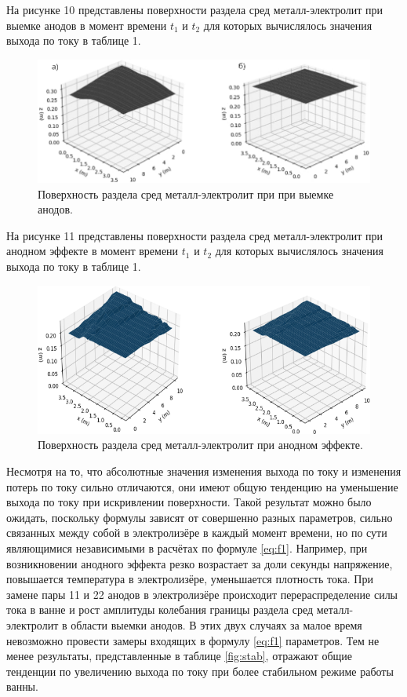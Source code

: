 \documentclass[]{pmi}
\begin{document}
На рисунке 10 представлены поверхности раздела сред металл-электролит при выемке анодов в момент времени $t_1$ и $t_2$ для которых вычислялось значения выхода по току в таблице 1.

\begin{figure}[H]
    \centering
    \includegraphics[width=150mm]{Выемка анодов поверхность.png}
    \caption{Поверхность раздела сред металл-электролит при при выемке анодов.}
    \label{fig:viemkaanod} 
\end{figure}

На рисунке 11 представлены поверхности раздела сред металл-электролит при анодном эффекте в момент времени $t_1$ и $t_2$ для которых вычислялось значения выхода по току в таблице 1.

\begin{figure}[H]
    \centering
    \includegraphics[width=150mm]{Анодный эффект поверхность.png}
    \caption{Поверхность раздела сред металл-электролит при анодном эффекте.}
    \label{fig:anodeffect}
\end{figure}

Несмотря на то, что абсолютные значения изменения выхода по току и изменения потерь по току сильно отличаются, они имеют общую тенденцию на уменьшение выхода по току при искривлении поверхности. Такой результат можно было ожидать, поскольку формулы зависят от совершенно разных параметров, сильно связанных между собой в электролизёре в каждый момент времени, но по сути являющимися независимыми в расчётах по формуле \ref{eq:f1}. Например, при возникновении анодного эффекта резко возрастает за доли секунды напряжение, повышается температура в электролизёре, уменьшается плотность тока. При замене пары 11 и 22 анодов в электролизёре происходит перераспределение силы тока в ванне и рост амплитуды колебания границы раздела сред металл-электролит в области выемки анодов. В этих двух случаях за малое время невозможно провести замеры входящих в формулу \ref{eq:f1} параметров. Тем не менее результаты, представленные в таблице \ref{fig:stab}, отражают общие тенденции по увеличению выхода по току при более стабильном режиме работы ванны.
\end{document}
